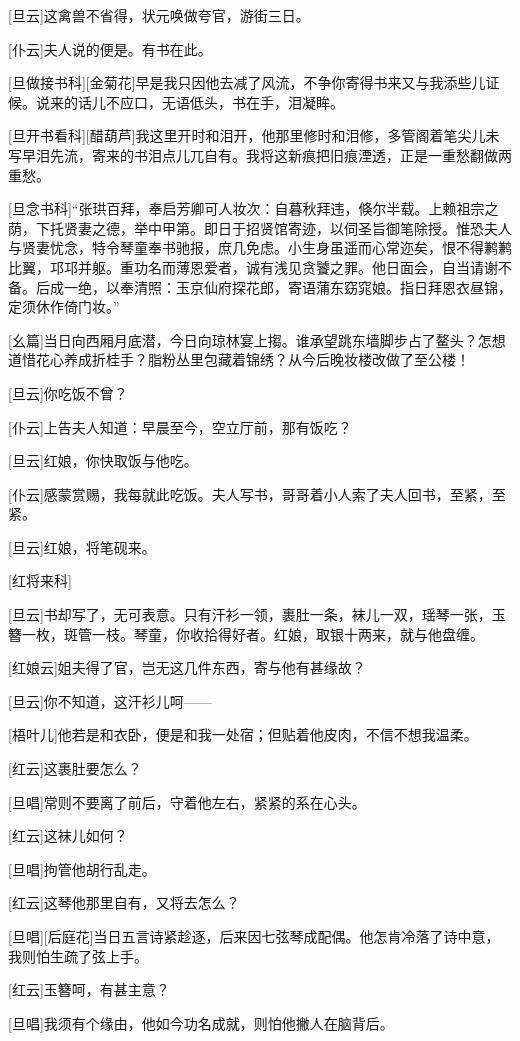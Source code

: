 \documentclass{book}
\begin{document}
[旦云]这禽兽不省得，状元唤做夸官，游街三日。

[仆云]夫人说的便是。有书在此。

[旦做接书科][金菊花]早是我只因他去减了风流，不争你寄得书来又与我添些儿证候。说来的话儿不应口，无语低头，书在手，泪凝眸。

[旦开书看科][醋葫芦]我这里开时和泪开，他那里修时和泪修，多管阁着笔尖儿未写早泪先流，寄来的书泪点儿兀自有。我将这新痕把旧痕湮透，正是一重愁翻做两重愁。

[旦念书科]``张珙百拜，奉启芳卿可人妆次：自暮秋拜违，倏尔半载。上赖祖宗之荫，下托贤妻之德，举中甲第。即日于招贤馆寄迹，以伺圣旨御笔除授。惟恐夫人与贤妻忧念，特令琴童奉书驰报，庶几免虑。小生身虽遥而心常迩矣，恨不得鹣鹣比翼，邛邛并躯。重功名而薄恩爱者，诚有浅见贪饕之罪。他日面会，自当请谢不备。后成一绝，以奉清照：玉京仙府探花郎，寄语蒲东窈窕娘。指日拜恩衣昼锦，定须休作倚门妆。''

[幺篇]当日向西厢月底潜，今日向琼林宴上搊。谁承望跳东墙脚步占了鳌头？怎想道惜花心养成折桂手？脂粉丛里包藏着锦绣？从今后晚妆楼改做了至公楼！

[旦云]你吃饭不曾？

[仆云]上告夫人知道：早晨至今，空立厅前，那有饭吃？

[旦云]红娘，你快取饭与他吃。

[仆云]感蒙赏赐，我每就此吃饭。夫人写书，哥哥着小人索了夫人回书，至紧，至紧。

[旦云]红娘，将笔砚来。

[红将来科]

[旦云]书却写了，无可表意。只有汗衫一领，裹肚一条，袜儿一双，瑶琴一张，玉簪一枚，斑管一枝。琴童，你收拾得好者。红娘，取银十两来，就与他盘缠。

[红娘云]姐夫得了官，岂无这几件东西，寄与他有甚缘故？

[旦云]你不知道，这汗衫儿呵——

[梧叶儿]他若是和衣卧，便是和我一处宿；但贴着他皮肉，不信不想我温柔。

[红云]这裹肚要怎么？

[旦唱]常则不要离了前后，守着他左右，紧紧的系在心头。

[红云]这袜儿如何？

[旦唱]拘管他胡行乱走。

[红云]这琴他那里自有，又将去怎么？

[旦唱][后庭花]当日五言诗紧趁逐，后来因七弦琴成配偶。他怎肯冷落了诗中意，我则怕生疏了弦上手。

[红云]玉簪呵，有甚主意？

[旦唱]我须有个缘由，他如今功名成就，则怕他撇人在脑背后。
\end{document}
